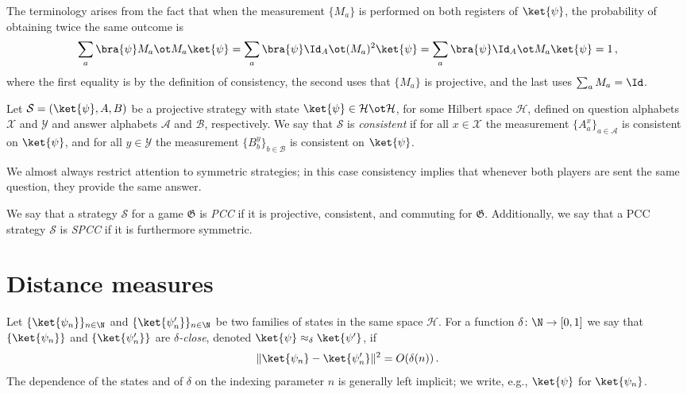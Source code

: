 The terminology arises from the fact that when the measurement $\{M_a\}$ is performed on both registers of $\ket{\psi}$, the probability of obtaining twice the same outcome is
\[
	\sum_a \bra{\psi} M_a \ot M_a \ket{\psi} = \sum_a \bra{\psi} \Id_A \ot (M_a)^2 \ket{\psi} = \sum_a \bra{\psi} \Id_A \ot M_a \ket{\psi} = 1\,,
\]
where the first equality is by the definition of consistency, the second uses that $\{M_a\}$ is projective, and the last uses $\sum_a M_a = \Id$.

\begin{definition}\label{def:consistent-strategy}
	\leanok
	Let $\mathcal S = (\ket{\psi}, A, B)$ be a projective strategy with state $\ket{\psi} \in \mathcal H \ot \mathcal H$, for some Hilbert space $\mathcal H$, defined on question alphabets $\mathcal X$ and $\mathcal Y$ and answer alphabets $\mathcal A$ and $\mathcal B$, respectively. We say that $\mathcal S$ is \emph{consistent} if for all $x \in \mathcal X$ the measurement $\{A^x_a\}_{a \in \mathcal A}$ is consistent on $\ket{\psi}$, and for all $y \in \mathcal Y$ the measurement $\{B^y_b\}_{b \in \mathcal B}$ is consistent on $\ket{\psi}$.
\end{definition}

We almost always restrict attention to symmetric strategies; in this case consistency implies that whenever both players are sent the same question, they provide the same answer.

\begin{definition}\label{def:spcc}
	\leanok
	We say that a strategy $\mathcal S$ for a game $\mathfrak G$ is \emph{PCC} if it is projective, consistent, and commuting for $\mathfrak G$. Additionally, we say that a PCC strategy $\mathcal S$ is \emph{SPCC} if it is furthermore symmetric.
\end{definition}

\section{Distance measures}

\begin{definition}\label{def:state-distance}
	Let $\{\ket{\psi_n}\}_{n \in \N}$ and $\{\ket{\psi'_n}\}_{n \in \N}$ be two families of states in the same space $\mathcal H$. For a function $\delta \colon \N \to [0,1]$ we say that $\{\ket{\psi_n}\}$ and $\{\ket{\psi'_n}\}$ are \emph{$\delta$-close}, denoted $\ket{\psi} \approx_\delta \ket{\psi'}$, if
	\[
		\lVert \ket{\psi_n} - \ket{\psi'_n} \rVert^2 = O(\delta(n))\,.
	\]
	The dependence of the states and of $\delta$ on the indexing parameter $n$ is generally left implicit; we write, e.g., $\ket{\psi}$ for $\ket{\psi_n}$.
\end{definition}

